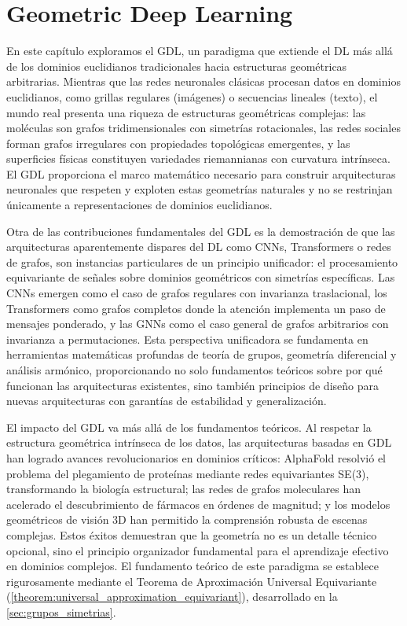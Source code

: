 \chapter{Geometric Deep Learning}\label{ch:gdl}

En este capítulo exploramos el \gls{GDL}, un paradigma que extiende el \gls{DL} más allá de los dominios euclidianos tradicionales hacia estructuras geométricas arbitrarias. Mientras que las redes neuronales clásicas procesan datos en dominios euclidianos, como grillas regulares (imágenes) o secuencias lineales (texto), el mundo real presenta una riqueza de estructuras geométricas complejas: las moléculas son grafos tridimensionales con simetrías rotacionales, las redes sociales forman grafos irregulares con propiedades topológicas emergentes, y las superficies físicas constituyen variedades riemannianas con curvatura intrínseca. El \gls{GDL} proporciona el marco matemático necesario para construir arquitecturas neuronales que respeten y exploten estas geometrías naturales y no se restrinjan únicamente a representaciones de dominios euclidianos.

Otra de las contribuciones fundamentales del \gls{GDL} es la demostración de que las arquitecturas aparentemente dispares del \gls{DL} como \glspl{CNN}, \glspl{Transformer} o redes de grafos, son instancias particulares de un principio unificador: el procesamiento equivariante de señales sobre dominios geométricos con simetrías específicas. Las \glspl{CNN} emergen como el caso de grafos regulares con invarianza traslacional, los \glspl{Transformer} como grafos completos donde la atención implementa un paso de mensajes ponderado, y las \glspl{GNN} como el caso general de grafos arbitrarios con invarianza a permutaciones. Esta perspectiva unificadora se fundamenta en herramientas matemáticas profundas de teoría de grupos, geometría diferencial y análisis armónico, proporcionando no solo fundamentos teóricos sobre por qué funcionan las arquitecturas existentes, sino también principios de diseño para nuevas arquitecturas con garantías de estabilidad y generalización.

El impacto del \gls{GDL} va más allá de los fundamentos teóricos. Al respetar la estructura geométrica intrínseca de los datos, las arquitecturas basadas en \gls{GDL} han logrado avances revolucionarios en dominios críticos: AlphaFold resolvió el problema del plegamiento de proteínas mediante redes equivariantes SE(3), transformando la biología estructural; las redes de grafos moleculares han acelerado el descubrimiento de fármacos en órdenes de magnitud; y los modelos geométricos de visión 3D han permitido la comprensión robusta de escenas complejas. Estos éxitos demuestran que la geometría no es un detalle técnico opcional, sino el principio organizador fundamental para el aprendizaje efectivo en dominios complejos. El fundamento teórico de este paradigma se establece rigurosamente mediante el Teorema de Aproximación Universal Equivariante (\autoref{theorem:universal_approximation_equivariant}), desarrollado en la \autoref{sec:grupos_simetrias}.

